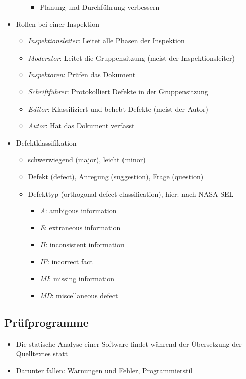 \documentclass{article}
\begin{document}
\begin{itemize}
\begin{itemize}
\begin{itemize}
      \item Planung und Durchführung verbessern
    \end{itemize}
  \end{itemize}
  \item Rollen bei einer Inspektion
  \begin{itemize}
    \item \textit{Inspektionsleiter}: Leitet alle Phasen der Inspektion
    \item \textit{Moderator}: Leitet die Gruppensitzung (meist der Inspektionsleiter)
    \item \textit{Inspektoren}: Prüfen das Dokument
    \item \textit{Schriftführer}: Protokolliert Defekte in der Gruppensitzung
    \item \textit{Editor}: Klassifiziert und behebt Defekte (meist der Autor)
    \item \textit{Autor}: Hat das Dokument verfasst
  \end{itemize}
  \item Defektklassifikation
  \begin{itemize}
    \item schwerwiegend (major), leicht (minor)
    \item Defekt (defect), Anregung (suggestion), Frage (question)
    \item Defekttyp (orthogonal defect classification), hier: nach NASA SEL
    \begin{itemize}
      \item \textit{A}: ambigous information
      \item \textit{E}: extraneous information
      \item \textit{II}: inconsistent information
      \item \textit{IF}: incorrect fact
      \item \textit{MI}: missing information
      \item \textit{MD}: miscellaneous defect
    \end{itemize}
  \end{itemize}
\end{itemize}

\subsection{Prüfprogramme}
\begin{itemize}
  \item Die statische Analyse einer Software findet während der Übersetzung der Quelltextes statt
  \item Darunter fallen: Warnungen und Fehler, Programmierstil
\end{itemize}
\end{document}
